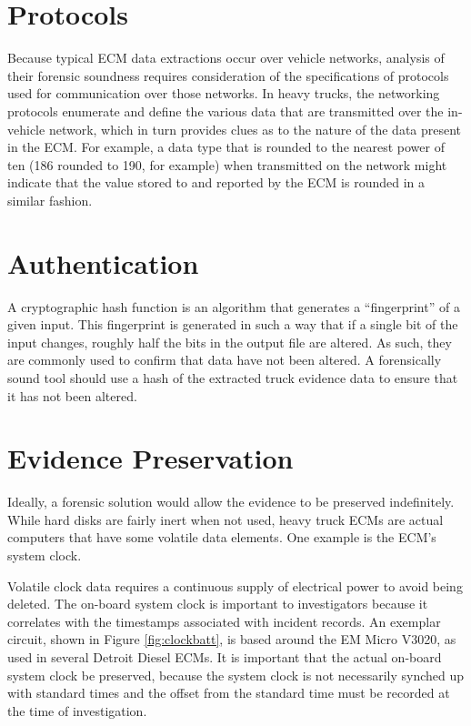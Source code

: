 \section{Protocols}

Because typical ECM data extractions occur over vehicle networks, analysis of their forensic soundness requires consideration of the specifications
of protocols  used for communication over those networks.
In heavy trucks, the networking protocols enumerate and define the various data that are transmitted over the in-vehicle network, which in turn provides clues as to the nature 
of the data present in the ECM. For example, a data type that is rounded to the nearest power of ten (186 rounded to 190, for example) when transmitted on the network might 
indicate that the value stored to and reported by the ECM is rounded in a similar fashion.

\section{Authentication}

A cryptographic hash function is an algorithm that generates a “fingerprint” of a given input. This fingerprint is generated in such a way that if a single bit of the input changes, 
roughly half the bits in the output file are altered\cite{schneier1996}. As such, they are commonly used to confirm that data have not been altered. A forensically sound tool should use a hash of 
the extracted truck evidence data to ensure that it has not been altered.

\section{Evidence Preservation}

Ideally, a forensic solution would allow the evidence to be preserved indefinitely. While hard disks are fairly inert when not used, heavy truck ECMs are actual computers that 
have some volatile data elements. One example is the ECM's system clock.

Volatile clock data requires a continuous supply of electrical power to avoid being deleted. The on-board 
system clock is important to investigators because it correlates with the timestamps associated with incident records. An exemplar circuit, shown in Figure \ref{fig:clockbatt}, is based around 
the EM Micro V3020, as used in several Detroit Diesel ECMs.  It is important that the actual on-board system clock be preserved, because the system clock is not necessarily synched 
up with standard times and the offset from the standard time must be recorded at the time of investigation.

